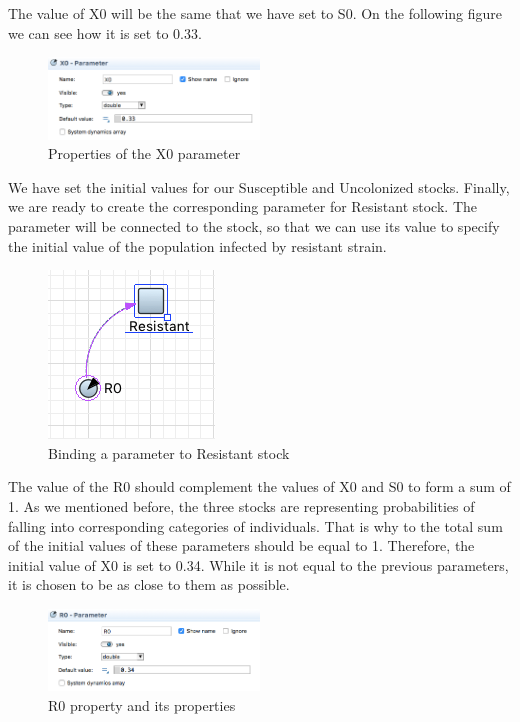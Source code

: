 The value of X0 will be the same that we have set to S0. On the following figure we can see how it is set to 0.33.

\begin{figure}[!ht]
  \centering
  \includegraphics[width=0.5\textwidth]{img/screens/basic/basic6}
  \caption{Properties of the X0 parameter}
\end{figure}

We have set the initial values for our Susceptible and Uncolonized stocks. Finally, we are ready to create the corresponding parameter for Resistant stock. The parameter will be connected to the stock, so that we can use its value to specify the initial value of the population infected by resistant strain.

\begin{figure}[!ht]
  \centering
  \includegraphics[height=0.2\textwidth]{img/screens/basic/basic10}
  \caption{Binding a parameter to Resistant stock}
\end{figure}

The value of the R0 should complement the values of X0 and S0 to form a sum of 1. As we mentioned before, the three stocks are representing probabilities of falling into corresponding categories of individuals. That is why to the total sum of the initial values of these parameters should be equal to 1. Therefore, the initial value of X0 is set to 0.34. While it is not equal to the previous parameters, it is chosen to be as close to them as possible.

\begin{figure}[!ht]
  \centering
  \includegraphics[width=0.5\textwidth]{img/screens/basic/basic5}
  \caption{R0 property and its properties}
\end{figure}


